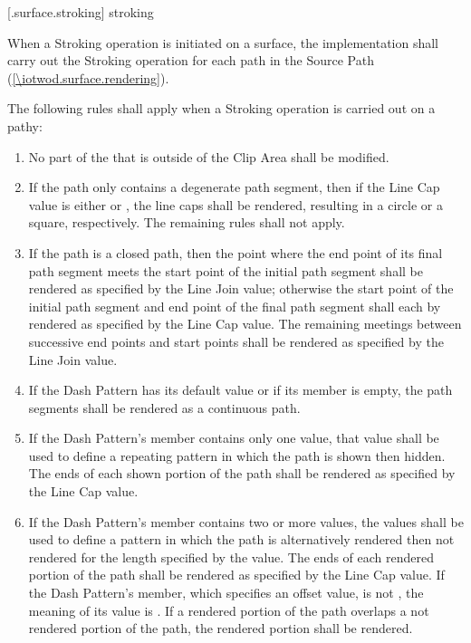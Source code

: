  [\iotwod.surface.stroking] { stroking}

\pnum
When a Stroking operation is initiated on a surface, the implementation shall carry out the Stroking operation for each path in the Source Path (\ref{\iotwod.surface.rendering}).

\pnum
The following rules shall apply when a Stroking operation is carried out on a pathy:
\begin{enumerate}
\item No part of the \underlyingsurface that is outside of the Clip Area shall be modified.

\item If the path only contains a degenerate path segment, then if the Line Cap value is either  or , the line caps shall be rendered, resulting in a circle or a square, respectively. The remaining rules shall not apply.

\item If the path is a closed path, then the point where the end point of its final path segment meets the start point of the initial path segment shall be rendered as specified by the Line Join value; otherwise the start point of the initial path segment and end point of the final path segment shall each by rendered as specified by the Line Cap value. The remaining meetings between successive end points and start points shall be rendered as specified by the Line Join value.

\item If the Dash Pattern has its default value or if its  member is empty, the path segments shall be rendered as a continuous path.

\item If the Dash Pattern's  member contains only one value, that value shall be used to define a repeating pattern in which the path is shown then hidden. The ends of each shown portion of the path shall be rendered as specified by the Line Cap value.

\item If the Dash Pattern's  member contains two or more values, the values shall be used to define a pattern in which the path is alternatively rendered then not rendered for the length specified by the value. The ends of each rendered portion of the path shall be rendered as specified by the Line Cap value. If the Dash Pattern's  member, which specifies an offset value, is not , the meaning of its value is . If a rendered portion of the path overlaps a not rendered portion of the path, the rendered portion shall be rendered.
\end{enumerate}

